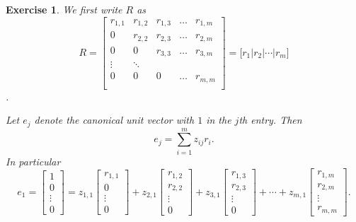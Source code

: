 \documentclass[paper=a4, fontsize=11pt]{scrartcl} %
\numberwithin{equation}{section} %
\numberwithin{figure}{section} %
\numberwithin{table}{section} %
\newtheorem{exercise}{Exercise}
\numberwithin{exercise}{section}
\begin{document}
\begin{exercise}
We first write  $R$ as
$$R=\begin{bmatrix}
r_{1,1} & r_{1,2} & r_{1,3}&\dots & r_{1,m} \\
0 & r_{2,2} &  r_{2,3} &\dots  & r_{2,m}\\
0& 0 &  r_{3,3} &\dots & r_{3,m} \\
\vdots & \ddots & \\
0 & 0 & 0 &\dots & r_{m,m} \\
\end{bmatrix}= \Bigg[ r_1 \Big | r_2  \Big | \cdots  \Big | r_m\Bigg]$$.

Let $e_j$ denote the canonical unit vector with $1$ in the $j$th entry.
Then 
$$e_j=\sum_{i=1}^m z_{ij}r_i.$$
In particular $$e_1=\begin{bmatrix}
1\\
0\\
\vdots \\
0\end{bmatrix}=z_{1,1}\begin{bmatrix}
r_{1,1}\\
0\\
\vdots \\
0\end{bmatrix}+z_{2,1}\begin{bmatrix}
r_{1,2}\\
r_{2,2}\\
\vdots \\
0\end{bmatrix}+z_{3,1}\begin{bmatrix}
r_{1,3}\\
r_{2,3}\\
\vdots \\
0\end{bmatrix} +\cdots+z_{m,1}\begin{bmatrix}
r_{1,m}\\
r_{2,m}\\
\vdots \\
r_{m,m}\end{bmatrix}.$$


\end{exercise}
\end{document}
